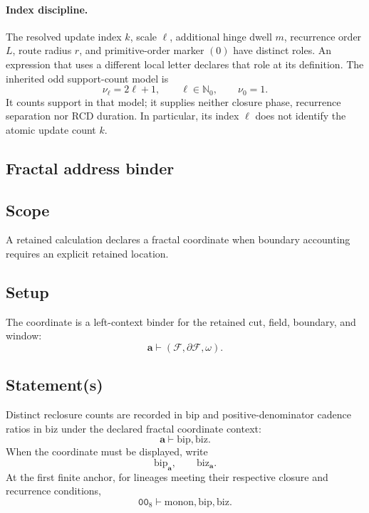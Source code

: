 \paragraph{Index discipline.}
\label{app:index-discipline}
The resolved update index \(k\), scale \(\ell\), additional hinge dwell \(m\),
recurrence order \(L\), route radius \(r\), and primitive-order marker \((0)\)
have distinct roles. An expression that uses a different local letter declares
that role at its definition. The inherited odd support-count model is
\begin{equation}
\nu_\ell=2\ell+1,\qquad \ell\in\mathbb N_0,\qquad \nu_0=1.
\label{eq:odd-support-index}
\end{equation}
It counts support in that model; it supplies neither closure phase, recurrence
separation nor RCD duration. In particular, its index \(\ell\) does not identify
the atomic update count \(k\).

\subsection{Fractal address binder}
\label{app:fractal-address-bip-biz}

\subsection{Scope}
\label{app:fractal-address:scope}
A retained calculation declares a fractal coordinate when boundary accounting requires an explicit retained location.

\subsection{Setup}
\label{app:fractal-address:setup}
The coordinate is a left-context binder for the retained cut, field, boundary, and window:
\[
\mathbf a\vdash(\mathcal F,\partial\mathcal F,\omega).
\]

\subsection{Statement(s)}
\label{app:fractal-address:statements}
Distinct reclosure counts are recorded in \(\mathrm{bip}\) and positive-denominator cadence ratios in \(\mathrm{biz}\) under the declared fractal coordinate context:
\[
\mathbf a\vdash \mathrm{bip},\mathrm{biz}.
\]
When the coordinate must be displayed, write
\[
\mathrm{bip}_{\mathbf a},\qquad \mathrm{biz}_{\mathbf a}.
\]
At the first finite anchor, for lineages meeting their respective closure and recurrence conditions,
\[
\mathtt{00}_8\vdash \mathrm{monon},\mathrm{bip},\mathrm{biz}.
\]

